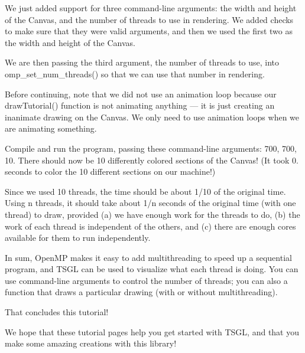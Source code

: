 We just added support for three command-\/line arguments\+: the width and height of the Canvas, and the number of threads to use in rendering. We added checks to make sure that they were valid arguments, and then we used the first two as the width and height of the Canvas.

We are then passing the third argument, the number of threads to use, into {\ttfamily omp\+\_\+set\+\_\+num\+\_\+threads()} so that we can use that number in rendering.

Before continuing, note that we did not use an animation loop because our {\ttfamily draw\+Tutorial()} function is not animating anything — it is just creating an inanimate drawing on the Canvas. We only need to use animation loops when we are animating something.

Compile and run the program, passing these command-\/line arguments\+: 700, 700, 10. There should now be 10 differently colored sections of the Canvas! (It took 0. seconds to color the 10 different sections on our machine!)

Since we used 10 threads, the time should be about 1/10 of the original time. Using n threads, it should take about 1/n seconds of the original time (with one thread) to draw, provided (a) we have enough work for the threads to do, (b) the work of each thread is independent of the others, and (c) there are enough cores available for them to run independently.

In sum, Open\+MP makes it easy to add multithreading to speed up a sequential program, and T\+S\+GL can be used to visualize what each thread is doing. You can use command-\/line arguments to control the number of threads; you can also a function that draws a particular drawing (with or without multithreading).

That concludes this tutorial!

We hope that these tutorial pages help you get started with T\+S\+GL, and that you make some amazing creations with this library! 